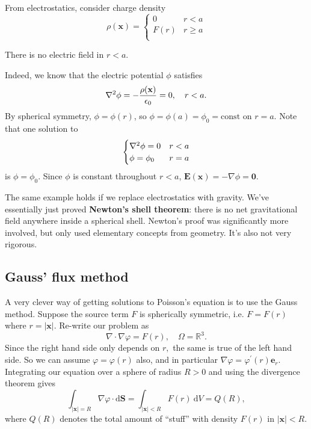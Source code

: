 \begin{example}
    From electrostatics, consider charge density
    \[
        \rho(\mathbf{x}) = \begin{cases}
        0 &r<a\\
        F(r) &r\ge a\\
        \end{cases} 
    \]
    \begin{claim}
        There is no electric field in $ r<a $.
    \end{claim}
    Indeed, we know that the electric potential $ \phi $ satisfies 
    \[
        \laplacian \phi = -\frac{\rho(\mathbf{x})}{\epsilon_0}=0,\quad r<a.
    \]
    By spherical symmetry, $ \phi=\phi(r) $, so $ \phi=\phi(a)=\phi_0=\text{const} $ on $ r=a $. Note that one solution to 
    \[
        \begin{cases}
        \laplacian \phi=0 &r<a\\
        \phi=\phi_0 &r=a\\
        \end{cases} 
    \]
    is $ \phi=\phi_0 $. Since $\phi$ is constant throughout $r < a$, $\mathbf{E}(\mathbf{x}) = - \nabla \phi= \mathbf{0}$.
\end{example}

The same example holds if we replace electrostatics with gravity. We’ve essentially just proved \textbf{Newton’s shell theorem}: there is no net gravitational field anywhere inside a spherical shell. Newton’s proof was significantly more involved, but only used elementary concepts from geometry. It’s also not very rigorous.

\subsection{Gauss’ flux method}
A very clever way of getting solutions to Poisson's equation is to use the Gauss method. Suppose the source term $F$ is spherically symmetric, i.e. $F=F(r)$ where $r=|\mathbf{x}| .$ Re-write our problem as
\[
    \nabla \cdot \nabla \varphi=F(r),\quad \Omega = \mathbb{R}^{3}.
\]
Since the right hand side only depends on $r,$ the same is true of the left hand side. So we can assume $\varphi=\varphi(r)$ also, and in particular $\nabla \varphi=\varphi^{\prime}(r) \mathbf{e}_{r} .$ Integrating our equation
over a sphere of radius $R>0$ and using the divergence theorem gives
\[
    \int_{|\mathbf{x}|=R} \nabla \varphi \cdot \mathrm{d} \mathbf{S}=\int_{|\mathbf{x}|<R} F(r) \mathrm{~d} V = Q(R),
\]
where $Q(R)$ denotes the total amount of ``stuff'' with density $F(r)$ in $|\mathbf{x}|<R$.

